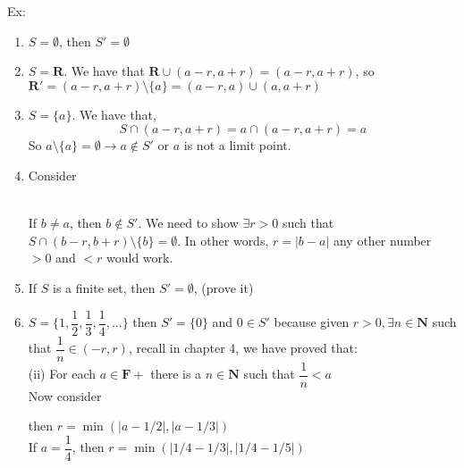 \documentclass[10pt,letterpaper]{article}
\begin{document}
	Ex: 
	\begin{enumerate}
		\item $S = \emptyset$, then $S' = \emptyset$
		\item $S = \mathbf{R}$. We have that $\mathbf{R} \cup (a - r, a + r) = (a - r, a + r)$,
		so $\mathbf{R'} = (a - r, a + r) \setminus \{a\} = (a - r, a) \cup (a, a + r)$
		\item $S = \{a\}$. We have that,
		$$S \cap (a - r, a + r) = a \cap (a - r, a + r) = a$$
		So $a \setminus \{a\} = \emptyset \rightarrow a \not\in S'$ or $a$ is not a limit
		point.
		\item Consider \\
		 \\
		If $b \neq a$, then $b \not\in S'$. We need to show $\exists r > 0$ such that
		$S \cap (b - r, b + r) \setminus \{b\} = \emptyset$. In other words,
		$r = |b - a|$ any other number $> 0$ and $ < r$ would work.
		
		\item If $S$ is a finite set, then $S' = \emptyset$, (prove it)
		\item $S = \{1, \dfrac{1}{2}, \dfrac{1}{3}, \dfrac{1}{4}, \ldots \}$ then $S' = \{0\}$
		and $0 \in S'$ because given $r > 0, \exists n \in \mathbf{N}$ such that $\dfrac{1}{n} \in (-r, r)$,
		recall in chapter 4, we have proved that: \\
		(ii) For each $a \in \mathbf{F+}$ there is a $n \in \mathbf{N}$ such that $\dfrac{1}{n} < a$ \\
		Now consider \\
		\newline
		then $r = \min(|a - 1/2|, |a - 1/3|)$ \\
		If $a = \dfrac{1}{4}$, then $r = \min(|1/4 - 1/3|, |1/4 - 1/5|)$
	\end{enumerate}
\end{document}
